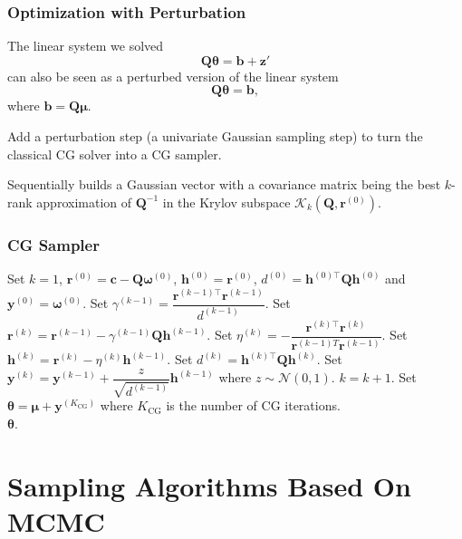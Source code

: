 \documentclass[aspectratio=169]{beamer}
\newcommand{\B}[1]{\mathbf{#1}} %
\newcommand{\Bs}[1]{\boldsymbol{#1}} %
\newcommand{\nr}[1]{\left\|#1\right\|} %
\begin{document}
\begin{frame}
\frametitle{Optimization with Perturbation}
The linear system we solved
\[\B{Q}\Bs{\theta} = \B{b} + \B{z}'\]
can also be seen as a perturbed version of the linear system
\[\B{Q}\Bs{\theta} = \B{b},\]
where $\B{b} = \B{Q}\Bs{\mu}$.

Add a perturbation step (a univariate Gaussian sampling step) to turn the classical CG solver into a CG sampler.

Sequentially builds a Gaussian vector with a covariance matrix being the best $k$-rank approximation of $\B{Q}^{-1}$ in the Krylov subspace $\mathcal{K}_k(\B{Q},\B{r}^{(0)})$. 
\end{frame}

\begin{frame}
\frametitle{CG Sampler}
\begin{algorithmic}[1]
    \State Set $k=1$, $\B{r}^{(0)} = \B{c} - \B{Q}\Bs{\omega}^{(0)}$, $\B{h}^{(0)} = \B{r}^{(0)}$, $d^{(0)} = \B{h}^{(0)\top}\B{Qh}^{(0)}$ and $\B{y}^{(0)} = \Bs{\omega}^{(0)}$. 
    \While{$\nr{\B{r}^{(k)}} \geq \epsilon$} 
    \State Set $\gamma^{(k-1)} = \dfrac{\B{r}^{(k-1)\top}\B{r}^{(k-1)}}{d^{(k-1)}}$.
    \State Set $\B{r}^{(k)} = \B{r}^{(k-1)} - \gamma^{(k-1)}\B{Qh}^{(k-1)}$.
    \State Set $\eta^{(k)} = -\dfrac{\B{r}^{(k)\top}\B{r}^{(k)}}{\B{r}^{(k-1)T}\B{r}^{(k-1)}}$.
    \State Set $\B{h}^{(k)} = \B{r}^{(k)} - \eta^{(k)}\B{h}^{(k-1)}$.
    \State Set $d^{(k)} = \B{h}^{(k)\top}\B{Qh}^{(k)}$.
    \State Set $\B{y}^{(k)} = \B{y}^{(k-1)} + \dfrac{z}{\sqrt{d^{(k-1)}}}\B{h}^{(k-1)}$ where $z \sim \mathcal{N}(0,1)$. \Comment{\textcolor{blue}{Perturbation}} 
    \State $k = k + 1$.
    \EndWhile
    \State Set $\Bs{\theta} = \Bs{\mu} + \B{y}^{(K_{\text{CG}})}$ where $K_{\text{CG}}$ is the number of CG iterations.\\
\Return $\Bs{\theta}$.
\end{algorithmic}
\end{frame}

\section{Sampling Algorithms Based On MCMC}
\end{document}
